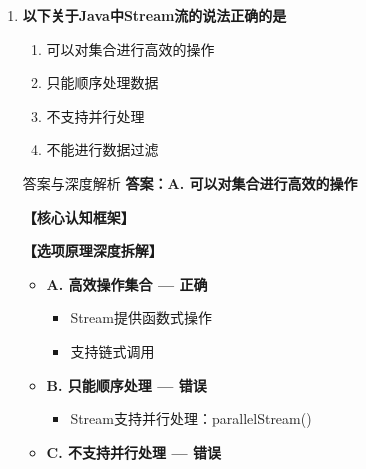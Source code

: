 \documentclass[12pt, a4paper]{ctexart}
\begin{document}
\begin{enumerate}[label=\textbf{\arabic*.}]
\begin{bluebox}{答案与深度解析}
\begin{itemize}[label={}, leftmargin=*, nosep]
\begin{itemize}[label={}, nosep]
			      \item 方法引用本质上就是Lambda表达式
		      
		      
	      
	      
					  \end{itemize}
					  \end{itemize}
\end{bluebox}

	      \vspace{1em}

	\item \textbf{以下关于Java中Stream流的说法正确的是}
	      \begin{enumerate}[label=\Alph*.]
		      \item 可以对集合进行高效的操作
		      \item 只能顺序处理数据
		      \item 不支持并行处理
		      \item 不能进行数据过滤
	      \end{enumerate}

	      \begin{bluebox}{答案与深度解析}
		      \textbf{答案：A. 可以对集合进行高效的操作}

		      \textbf{【核心认知框架】}

		      \textbf{【选项原理深度拆解】}
					  \begin{itemize}[label={}, leftmargin=*, nosep]

		      
		      \item \textbf{A. 高效操作集合 — 正确}
					  \begin{itemize}[label={}, nosep]
		      
			      \item Stream提供函数式操作
			      \item 支持链式调用
		      

					  \end{itemize}
		      \item \textbf{B. 只能顺序处理 — 错误}
					  \begin{itemize}[label={}, nosep]
		      
			      \item Stream支持并行处理：parallelStream()
		      

					  \end{itemize}
		      \item \textbf{C. 不支持并行处理 — 错误}
					  \begin{itemize}[label={}, nosep]
		      

\end{itemize}
\end{itemize}
\end{bluebox}
\end{enumerate}
\end{document}
